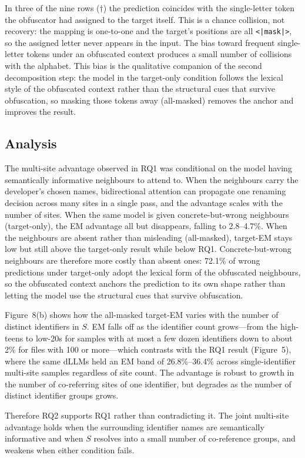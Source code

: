 In three of the nine rows ($\dagger$) the prediction coincides with the
single-letter token the obfuscator had assigned to the target itself. This is a
chance collision, not recovery: the mapping is one-to-one and the target's
positions are all \texttt{<|mask|>}, so the assigned letter never appears in the
input. The bias toward frequent single-letter tokens under an obfuscated context
produces a small number of collisions with the alphabet. This bias is the
qualitative companion of the second decomposition step: the model in the
target-only condition follows the lexical style of the obfuscated context rather
than the structural cues that survive obfuscation, so masking those tokens away
(all-masked) removes the anchor and improves the result.

\subsection{Analysis}
The multi-site advantage observed in RQ1 was conditional on the model having
semantically informative neighbours to attend to. When the neighbours carry the
developer's chosen names, bidirectional attention can propagate one renaming
decision across many sites in a single pass, and the advantage scales with the
number of sites. When the same model is given concrete-but-wrong neighbours
(target-only), the EM advantage all but disappears, falling to 2.8--4.7\%. When
the neighbours are absent rather than misleading (all-masked), target-EM stays
low but still above the target-only result while below RQ1. Concrete-but-wrong
neighbours are therefore more costly than absent ones: 72.1\% of wrong
predictions under target-only adopt the lexical form of the obfuscated
neighbours, so the obfuscated context anchors the prediction to its own shape
rather than letting the model use the structural cues that survive obfuscation.

Figure~8(b) shows how the all-masked target-EM varies with the number of
distinct identifiers in $S$. EM falls off as the identifier count grows---from
the high-teens to low-20s for samples with at most a few dozen identifiers down
to about 2\% for files with 100 or more---which contrasts with the RQ1 result
(Figure~5), where the same dLLMs held an EM band of 26.8\%--36.4\% across
single-identifier multi-site samples regardless of site count. The advantage is
robust to growth in the number of co-referring sites of one identifier, but
degrades as the number of distinct identifier groups grows.

Therefore RQ2 supports RQ1 rather than contradicting it. The joint multi-site
advantage holds when the surrounding identifier names are semantically
informative and when $S$ resolves into a small number of co-reference groups,
and weakens when either condition fails.


